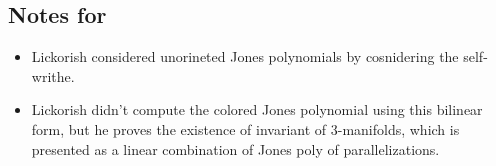 \subsection*{Notes for \cite{Lickorish91}}
\begin{itemize}
    \item Lickorish considered unorineted Jones polynomials by cosnidering the self-writhe.
    \item Lickorish didn't compute the colored Jones polynomial using this bilinear form, but he proves the existence of invariant of 3-manifolds, which is presented as a linear combination of Jones poly of parallelizations.
\end{itemize}

